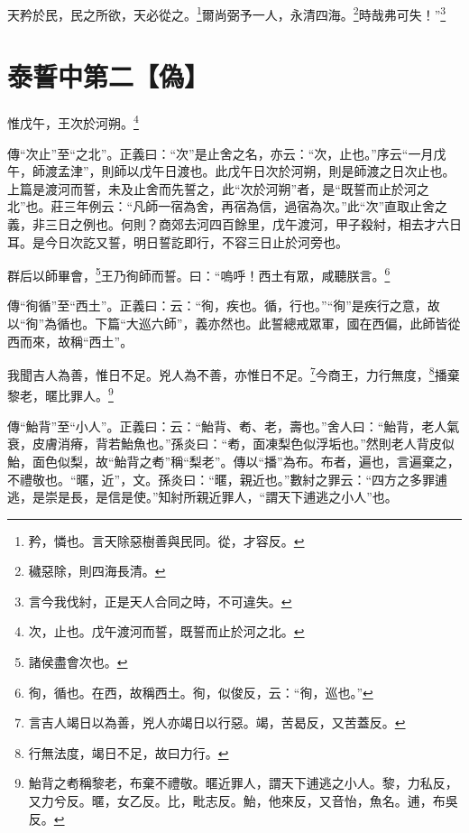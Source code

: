 天矜於民，民之所欲，天必從之。\footnote{矜，憐也。言天除惡樹善與民同。從，才容反。}爾尚弼予一人，永清四海。\footnote{穢惡除，則四海長清。}時哉弗可失！”\footnote{言今我伐紂，正是天人合同之時，不可違失。}

\section{泰誓中第二【偽】}


惟戊午，王次於河朔。\footnote{次，止也。戊午渡河而誓，既誓而止於河之北。}

{\noindent\zhuan{}\fzbyks 傳“次止”至“之北”。正義曰：“次”是止舍之名，亦云：“次，止也。”序云“一月戊午，師渡孟津”，則師以戊午日渡也。此戊午日次於河朔，則是師渡之日次止也。上篇是渡河而誓，未及止舍而先誓之，此“次於河朔”者，是“既誓而止於河之北”也。莊三年例云：“凡師一宿為舍，再宿為信，過宿為次。”此“次”直取止舍之義，非三日之例也。何則？商郊去河四百餘里，戊午渡河，甲子殺紂，相去才六日耳。是今日次訖又誓，明日誓訖即行，不容三日止於河旁也。 \par}

群后以師畢會，\footnote{諸侯盡會次也。}王乃徇師而誓。曰：“嗚呼！西土有眾，咸聽朕言。\footnote{徇，循也。在西，故稱西土。徇，似俊反，云：“徇，巡也。”}

{\noindent\zhuan{}\fzbyks 傳“徇循”至“西土”。正義曰：云：“徇，疾也。循，行也。”“徇”是疾行之意，故以“徇”為循也。下篇“大巡六師”，義亦然也。此誓總戒眾軍，國在西偏，此師皆從西而來，故稱“西土”。 \par}

我聞吉人為善，惟日不足。兇人為不善，亦惟日不足。\footnote{言吉人竭日以為善，兇人亦竭日以行惡。竭，苦曷反，又苦蓋反。}今商王，力行無度，\footnote{行無法度，竭日不足，故曰力行。}播棄黎老，暱比罪人。\footnote{鮐背之耇稱黎老，布棄不禮敬。暱近罪人，謂天下逋逃之小人。黎，力私反，又力兮反。暱，女乙反。比，毗志反。鮐，他來反，又音怡，魚名。逋，布吳反。}

{\noindent\zhuan{}\fzbyks 傳“鮐背”至“小人”。正義曰：云：“鮐背、耇、老，壽也。”舍人曰：“鮐背，老人氣衰，皮膚消瘠，背若鮐魚也。”孫炎曰：“耇，面凍梨色似浮垢也。”然則老人背皮似鮐，面色似梨，故“鮐背之耇”稱“梨老”。傳以“播”為布。布者，遍也，言遍棄之，不禮敬也。“暱，近”，文。孫炎曰：“暱，親近也。”數紂之罪云：“四方之多罪逋逃，是崇是長，是信是使。”知紂所親近罪人，“謂天下逋逃之小人”也。 \par}

